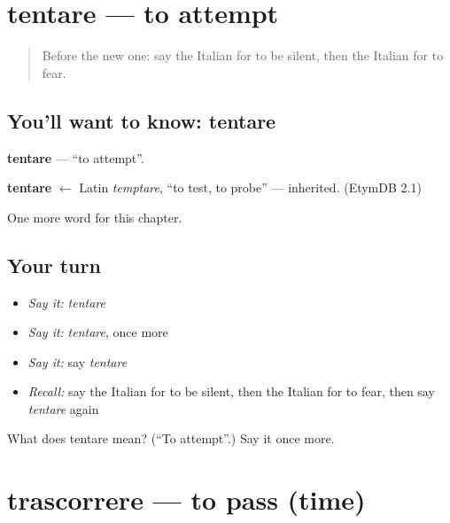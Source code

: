\section[tentare]{tentare — to attempt}

\label{lesson:IT-C148-tentare}



\begin{quote}
Before the new one: say the Italian for to be silent, then the Italian for to fear.
\end{quote}

\subsection*{You'll want to know: tentare}
\textbf{tentare} — \textquotedblleft{}to attempt\textquotedblright{}.

\begin{cousinweb}
\textbf{tentare} $\leftarrow$ Latin \emph{temptare}, \textquotedblleft{}to test, to probe\textquotedblright{} — inherited. (EtymDB 2.1)
\end{cousinweb}

\begin{grammarlens}[title={What you've built}]
One more word for this chapter.
\end{grammarlens}

\subsection*{Your turn}
\begin{itemize}
\raggedright
  \item \emph{Say it:} \emph{tentare}
  \item \emph{Say it:} \emph{tentare}, once more
  \item \emph{Say it:} say \emph{tentare}
  \item \emph{Recall:} say the Italian for to be silent, then the Italian for to fear, then say \emph{tentare} again
\end{itemize}

\begin{tcolorbox}[breakable,colback=teal!4,colframe=teal!35!black,title={Before you move on}]
What does tentare mean? (\textquotedblleft{}To attempt\textquotedblright{}.) Say it once more.
\end{tcolorbox}
\section[trascorrere]{trascorrere — to pass (time)}

